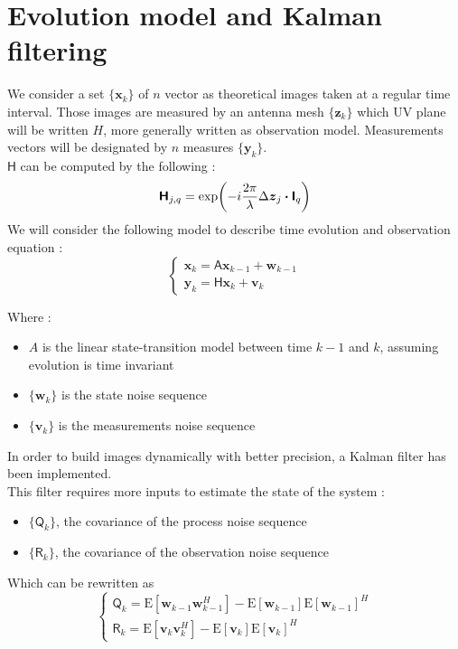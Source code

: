 \documentclass[titlepage]{article}
\renewcommand{\expval}[1]{\text{E}\left[#1\right]}
\newcommand{\w}{\boldsymbol{w}}
\renewcommand{\v}{\boldsymbol{v}}
\newcommand{\Q}{\boldsymbol{\mathsf{Q}}}
\newcommand{\R}{\boldsymbol{\mathsf{R}}}
\renewcommand{\H}{\boldsymbol{\mathsf{H}}}
\newcommand{\A}{\boldsymbol{\mathsf{A}}}
\newcommand{\I}{\boldsymbol{\mathsf{I}}}
\newcommand{\x}{\boldsymbol{x}}
\newcommand{\y}{\boldsymbol{y}}
\newcommand{\z}{\boldsymbol{z}}
\newcommand{\dz}{\Delta\boldsymbol{z}}
\begin{document}
	\section{Evolution model and Kalman filtering}
	
	We consider a set $\{\x_k\}$ of $n$ vector as theoretical images taken at a regular time interval. Those images are measured by an antenna mesh $\{\z_k\}$ which UV plane will be written $H$, more generally written as observation model. Measurements vectors will be designated by $n$ measures $\{\y_k\}$.\\
	$\H$ can be computed by the following :
	\begin{equation}
		\H_{j,q} = \exp(-i\frac{2\pi}{\lambda}\dz_{j}\dotproduct\I_q)
	\end{equation}
	We will consider the following model to describe time evolution and observation equation :
	$$
		\begin{cases}
			\x_k = \A\x_{k-1} + \w_{k-1}\\
			\y_k = \H\x_k + \v_k
		\end{cases}
	$$
	
	Where :
	\begin{itemize}
		\item $A$ is the linear state-transition model between time $k-1$ and $k$, assuming evolution is time invariant
		\item $\{\w_k\}$ is the state noise sequence
		\item $\{\v_k\}$ is the measurements noise sequence
	\end{itemize}
	
		
	In order to build images dynamically with better precision, a Kalman filter has been implemented.\\
	
	This filter requires more inputs to estimate the state of the system :
	\begin{itemize}
		\item $\{\Q_k\}$, the covariance of the process noise sequence
		\item $\{\R_k\}$, the covariance of the observation noise sequence
	\end{itemize}

	Which can be rewritten as
	$$
		\begin{cases}
			\Q_k = \expval{\w_{k-1}\w_{k-1}^H} - \expval{\w_{k-1}}\expval{\w_{k-1}}^H \\
			\R_k = \expval{\v_{k}\v_{k}^H} - \expval{\v_k}\expval{\v_k}^H 
		\end{cases}
	$$
	
\end{document}
